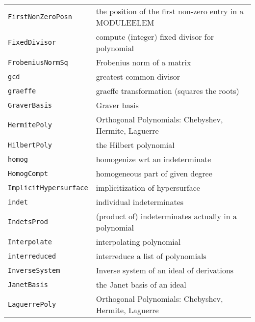 \documentclass[a4paper]{mybook}
\begin{document}
\begin{center}
\begin{longtable}{ll}
{\verb~FirstNonZeroPosn~} &
      the position of the first non-zero entry in a MODULEELEM\\
   
{\verb~FixedDivisor~} &
      compute (integer) fixed divisor for polynomial\\
   
{\verb~FrobeniusNormSq~} &
      Frobenius norm of a matrix\\
   
{\verb~gcd~} &
      greatest common divisor\\
   
{\verb~graeffe~} &
      graeffe transformation (squares the roots)\\
   
{\verb~GraverBasis~} &
      Graver basis\\
   
{\verb~HermitePoly~} &
      Orthogonal Polynomials: Chebyshev, Hermite, Laguerre\\
   
{\verb~HilbertPoly~} &
      the Hilbert polynomial\\
   
{\verb~homog~} &
      homogenize wrt an indeterminate\\
   
{\verb~HomogCompt~} &
      homogeneous part of given degree\\
   
{\verb~ImplicitHypersurface~} &
      implicitization of hypersurface\\
   
{\verb~indet~} &
      individual indeterminates\\
   
{\verb~IndetsProd~} &
      (product of) indeterminates actually in a polynomial\\
   
{\verb~Interpolate~} &
      interpolating polynomial\\
   
{\verb~interreduced~} &
      interreduce a list of polynomials\\
   
{\verb~InverseSystem~} &
      Inverse system of an ideal of derivations\\
   
{\verb~JanetBasis~} &
      the Janet basis of an ideal\\
   
{\verb~LaguerrePoly~} &
      Orthogonal Polynomials: Chebyshev, Hermite, Laguerre\\
   

\end{longtable}
\end{center}
\end{document}
